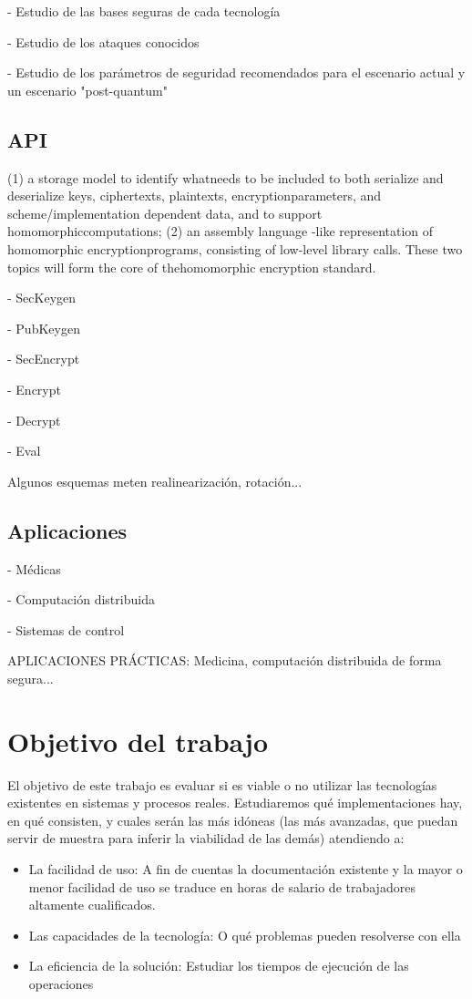 - Estudio de las bases seguras de cada tecnología

- Estudio de los ataques conocidos

- Estudio de los parámetros de seguridad recomendados para el escenario actual y un escenario "post-quantum" \cite{citar}

\subsection{API}

\cite{brenner_standard_2017}

(1) a ​storage model​ to identify whatneeds to be included to both serialize and deserialize keys, ciphertexts, plaintexts, encryptionparameters, and scheme/implementation dependent data, and to support homomorphiccomputations; (2) an ​assembly language​ -like representation of homomorphic encryptionprograms, consisting of low-level library calls. These two topics will form the core of thehomomorphic encryption standard.

- SecKeygen

- PubKeygen

- SecEncrypt

- Encrypt

- Decrypt

- Eval


Algunos esquemas meten realinearización, rotación...

\subsection{Aplicaciones}

\cite{archer_applications_2017}

- Médicas

- Computación distribuida

- Sistemas de control

APLICACIONES PRÁCTICAS: Medicina, computación distribuida de forma segura...

\section{Objetivo del trabajo}

El objetivo de este trabajo es evaluar si es viable o no utilizar las tecnologías existentes en sistemas y procesos reales. Estudiaremos qué implementaciones hay, en qué consisten, y cuales serán las más idóneas (las más avanzadas, que puedan servir de muestra para inferir la viabilidad de las demás) atendiendo a:

\begin{itemize}
    \item La facilidad de uso: A fin de cuentas la documentación existente y la mayor o menor facilidad de uso se traduce en horas de salario de trabajadores altamente cualificados.
    \item Las capacidades de la tecnología: O qué problemas pueden resolverse con ella
    \item La eficiencia de la solución: Estudiar los tiempos de ejecución de las operaciones
\end{itemize}